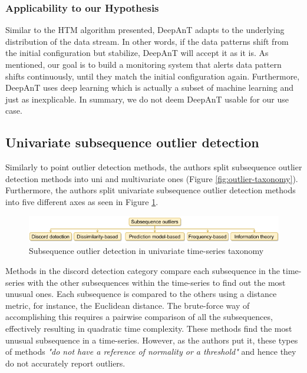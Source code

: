 \subsubsection*{Applicability to our Hypothesis}
Similar to the HTM algorithm presented, DeepAnT adapts to the underlying distribution of the data stream. In other words, if the data patterns shift from the initial configuration but stabilize, DeepAnT will accept it as it is. As mentioned, our goal is to build a monitoring system that alerts data pattern shifts continuously, until they match the initial configuration again. Furthermore, DeepAnT uses deep learning which is actually a subset of machine learning and just as inexplicable. In summary, we do not deem DeepAnT usable for our use case.


\subsection{Univariate subsequence outlier detection}
Similarly to point outlier detection methods, the authors split subsequence outlier detection methods into uni and multivariate ones (Figure \ref{fig:outlier-taxonomy}). Furthermore, the authors split univariate subsequence outlier detection methods into five different axes as seen in Figure \ref{fig:subsequence-outlier-taxonomy}.

\begin{figure}[!htb]
  \begin{center}
    \includegraphics[scale=0.8]{figures/taxonomy-subsequence-outlier-uni.png}
    \caption{Subsequence outlier detection in univariate time-series taxonomy}
    \label{fig:subsequence-outlier-taxonomy}
  \end{center}
\end{figure}

Methods in the discord detection category compare each subsequence in the time-series with the other subsequences within the time-series to find out the most unusual ones. Each subsequence is compared to the others using a distance metric, for instance, the Euclidean distance. The brute-force way of accomplishing this requires a pairwise comparison of all the subsequences, effectively resulting in quadratic time complexity. These methods find the most unusual subsequence in a time-series. However, as the authors put it, these types of methods \textit{"do not have a reference of normality or a threshold"} and hence they do not accurately report outliers.

